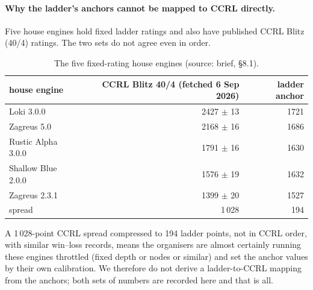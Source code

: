 \documentclass[11pt,a4paper]{article}
\newcommand{\src}[1]{{\small(source: #1)}}
\begin{document}
\paragraph{Why the ladder's anchors cannot be mapped to CCRL directly.} Five house engines hold fixed
ladder ratings and also have published CCRL Blitz (40/4) ratings. The two sets do not agree even in order.

\begin{table}[H]\centering\small
\begin{tabular}{@{}lrr@{}}
\toprule
house engine & CCRL Blitz 40/4 (fetched 6 Sep 2026) & ladder anchor \\
\midrule
Loki 3.0.0 & 2427 $\pm$ 13 & 1721 \\
Zagreus 5.0 & 2168 $\pm$ 16 & 1686 \\
Rustic Alpha 3.0.0 & 1791 $\pm$ 16 & 1630 \\
Shallow Blue 2.0.0 & 1576 $\pm$ 19 & 1632 \\
Zagreus 2.3.1 & 1399 $\pm$ 20 & 1527 \\
\midrule
spread & 1\,028 & 194 \\
\bottomrule
\end{tabular}
\caption{The five fixed-rating house engines \src{brief, \S 8.1}.}
\end{table}

A 1\,028-point CCRL spread compressed to 194 ladder points, not in CCRL order, with similar win--loss
records, means the organisers are almost certainly running these engines throttled (fixed depth or nodes
or similar) and set the anchor values by their own calibration. We therefore do not derive a ladder-to-CCRL
mapping from the anchors; both sets of numbers are recorded here and that is all.
\end{document}
